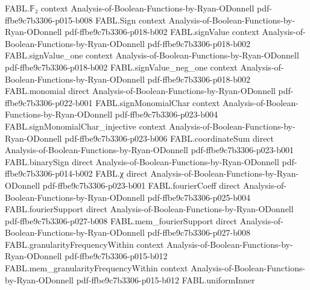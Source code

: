 \begin{theorem}
\label{FABL.setIndicator_binaryAffineSubspace_fourier_expansion}
\leanok
{}
\proofstep
  {FABL.𝔽₂}
  {context}
  {Analysis-of-Boolean-Functions-by-Ryan-ODonnell}
  {pdf-ffbe9c7b3306-p015-b008}
\proofstep
  {FABL.Sign}
  {context}
  {Analysis-of-Boolean-Functions-by-Ryan-ODonnell}
  {pdf-ffbe9c7b3306-p018-b002}
\proofstep
  {FABL.signValue}
  {context}
  {Analysis-of-Boolean-Functions-by-Ryan-ODonnell}
  {pdf-ffbe9c7b3306-p018-b002}
\proofstep
  {FABL.signValue_one}
  {context}
  {Analysis-of-Boolean-Functions-by-Ryan-ODonnell}
  {pdf-ffbe9c7b3306-p018-b002}
\proofstep
  {FABL.signValue_neg_one}
  {context}
  {Analysis-of-Boolean-Functions-by-Ryan-ODonnell}
  {pdf-ffbe9c7b3306-p018-b002}
\proofstep
  {FABL.monomial}
  {direct}
  {Analysis-of-Boolean-Functions-by-Ryan-ODonnell}
  {pdf-ffbe9c7b3306-p022-b001}
\proofstep
  {FABL.signMonomialChar}
  {context}
  {Analysis-of-Boolean-Functions-by-Ryan-ODonnell}
  {pdf-ffbe9c7b3306-p023-b004}
\proofstep
  {FABL.signMonomialChar_injective}
  {context}
  {Analysis-of-Boolean-Functions-by-Ryan-ODonnell}
  {pdf-ffbe9c7b3306-p023-b006}
\proofstep
  {FABL.coordinateSum}
  {direct}
  {Analysis-of-Boolean-Functions-by-Ryan-ODonnell}
  {pdf-ffbe9c7b3306-p023-b001}
\proofstep
  {FABL.binarySign}
  {direct}
  {Analysis-of-Boolean-Functions-by-Ryan-ODonnell}
  {pdf-ffbe9c7b3306-p014-b002}
\proofstep
  {FABL.χ}
  {direct}
  {Analysis-of-Boolean-Functions-by-Ryan-ODonnell}
  {pdf-ffbe9c7b3306-p023-b001}
\proofstep
  {FABL.fourierCoeff}
  {direct}
  {Analysis-of-Boolean-Functions-by-Ryan-ODonnell}
  {pdf-ffbe9c7b3306-p025-b004}
\proofstep
  {FABL.fourierSupport}
  {direct}
  {Analysis-of-Boolean-Functions-by-Ryan-ODonnell}
  {pdf-ffbe9c7b3306-p027-b008}
\proofstep
  {FABL.mem_fourierSupport}
  {direct}
  {Analysis-of-Boolean-Functions-by-Ryan-ODonnell}
  {pdf-ffbe9c7b3306-p027-b008}
\proofstep
  {FABL.granularityFrequencyWithin}
  {context}
  {Analysis-of-Boolean-Functions-by-Ryan-ODonnell}
  {pdf-ffbe9c7b3306-p015-b012}
\proofstep
  {FABL.mem_granularityFrequencyWithin}
  {context}
  {Analysis-of-Boolean-Functions-by-Ryan-ODonnell}
  {pdf-ffbe9c7b3306-p015-b012}
\proofstep
  {FABL.uniformInner}

\end{theorem}
